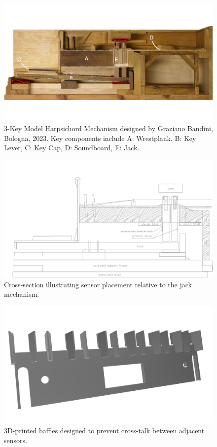 \begin{figure}
    \centering
    \includegraphics[width=\linewidth]{src/images/3-key-side-labelled.png}
    \caption{3-Key Model Harpsichord Mechanism designed by Graziano Bandini, Bologna, 2023. Key components include A: Wrestplank, B: Key Lever, C: Key Cap, D: Soundboard, E: Jack.}
    \label{fig:3key}
\end{figure}

\begin{figure}
    \centering
    \includegraphics[width=\linewidth]{src/images/CrossSectionSensorPlacement.jpg}
    \caption{Cross-section illustrating sensor placement relative to the jack mechanism.}
    \label{fig:cross-section}
\end{figure}

\begin{figure}
    \centering
    \includegraphics[width=\linewidth]{src/images/baffles.png}
    \caption{3D-printed baffles designed to prevent cross-talk between adjacent sensors.}
    \label{fig:baffles}
\end{figure}

